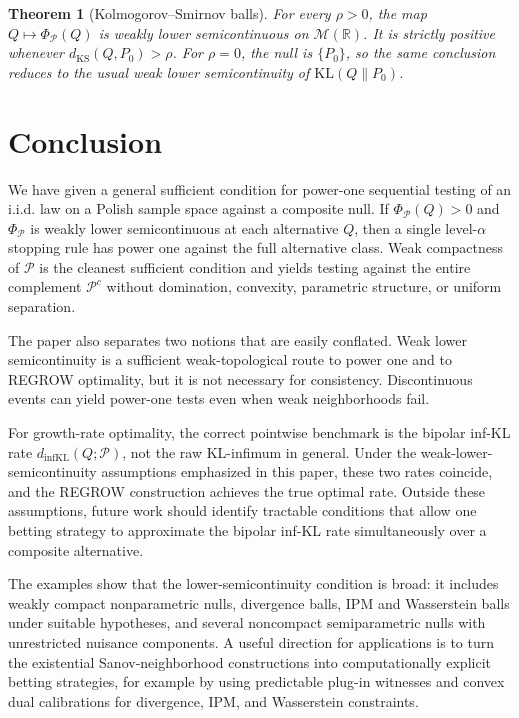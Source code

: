 \documentclass[11pt]{article}
\newcommand{\KS}{\mathrm{KS}}
\newcommand{\KL}{\mathrm{KL}}
\newcommand{\dinfKL}{d_{\mathrm{infKL}}}
\newcommand{\RR}{\mathbb{R}}
\newcommand{\Pcal}{\mathcal{P}}
\newcommand{\M}{\mathcal{M}}
\newtheorem{theorem}{Theorem}[section]
\theoremstyle{definition}
\theoremstyle{definition}
\begin{document}
\begin{theorem}[Kolmogorov--Smirnov balls]\label{thm:ks-lsc}
For every \(\rho>0\), the map
\(
  Q\mapsto\Phi_\Pcal(Q)
\)
is weakly lower semicontinuous on \(\M(\RR)\).  It is strictly positive whenever \(d_{\KS}(Q,P_0)>\rho\).  For \(\rho=0\), the null is \(\{P_0\}\), so the same conclusion reduces to the usual weak lower semicontinuity of \(\KL(Q\|P_0)\).
\end{theorem}




\section{Conclusion}\label{sec:conc}
We have given a general sufficient condition for power-one sequential testing of an i.i.d. law on a Polish sample space against a composite null.  If $\Phi_\Pcal(Q)>0$ and $\Phi_\Pcal$ is weakly lower semicontinuous at each alternative $Q$, then a single level-$\alpha$ stopping rule has power one against the full alternative class.  Weak compactness of $\Pcal$ is the cleanest sufficient condition and yields testing against the entire complement $\Pcal^c$ without domination, convexity, parametric structure, or uniform separation.

The paper also separates two notions that are easily conflated.  Weak lower semicontinuity is a sufficient weak-topological route to power one and to REGROW optimality, but it is not necessary for consistency.  Discontinuous events can yield power-one tests even when weak neighborhoods fail.

For growth-rate optimality, the correct pointwise benchmark is the bipolar inf-KL rate $\dinfKL(Q;\Pcal)$, not the raw KL-infimum in general.  Under the weak-lower-semicontinuity assumptions emphasized in this paper, these two rates coincide, and the REGROW construction achieves the true optimal rate.  Outside these assumptions, future work should identify tractable conditions that allow one betting strategy to approximate the bipolar inf-KL rate simultaneously over a composite alternative.

The examples show that the lower-semicontinuity condition is broad: it includes weakly compact nonparametric nulls, divergence balls, IPM and Wasserstein balls under suitable hypotheses, and several noncompact semiparametric nulls with unrestricted nuisance components.  A useful direction for applications is to turn the existential Sanov-neighborhood constructions into computationally explicit betting strategies, for example by using predictable plug-in witnesses and convex dual calibrations for divergence, IPM, and Wasserstein constraints.
\end{document}

